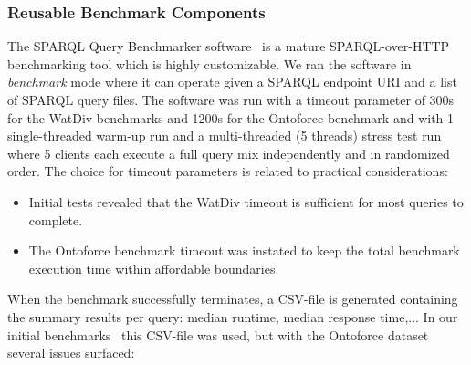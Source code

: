 \begin{table}[htbp!]
	\centering
	\caption{Different configuration choices defined in this benchmark}
	\label{table:configs}
\end{table}

\subsubsection{Reusable Benchmark Components}
The SPARQL Query Benchmarker software~\cite{sparqlquerybm} is a mature SPARQL-over-HTTP benchmarking tool which is highly customizable. We ran the software in \emph{benchmark} mode where it can operate given a SPARQL endpoint URI and a list of SPARQL query files. The software was run with a timeout parameter of 300s for the WatDiv benchmarks and 1200s for the Ontoforce benchmark and with 1 single-threaded warm-up run and a multi-threaded (5 threads) stress test run where 5 clients each execute a full query mix independently and in randomized order. 
The choice for timeout parameters is related to practical considerations: 
\begin{itemize}
	\item Initial tests revealed that the WatDiv timeout is sufficient for most queries to complete.
	\item The Ontoforce benchmark timeout was instated to keep the total benchmark execution time within affordable boundaries.
\end{itemize} 

When the benchmark successfully terminates, a CSV-file is generated containing the summary results per query: median runtime, median response time,...
In our initial benchmarks~\cite{de2016big} this CSV-file was used, but with the Ontoforce dataset several issues surfaced:

